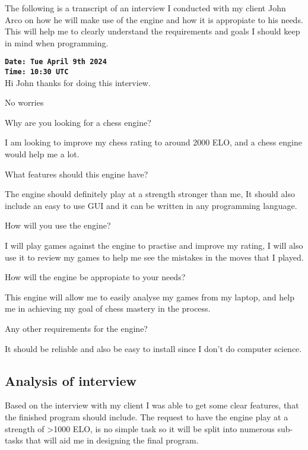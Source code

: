 The following is a transcript of an interview I
conducted with my client John Arco on how he will make use of the
engine and how it is appropiate to his needs. This will 
help me to clearly understand the requirements and goals I
should keep in mind when programming.

\begin{tcolorbox}
\textbf{\texttt {Date: Tue April 9th 2024}}\\
\textbf{\texttt {Time: 10:30 UTC}}\\
 Hi John thanks for doing this interview. \par
{} No worries \par 
{} Why are you looking for a chess engine?\par
{} I am looking to improve my
chess rating to around 2000 ELO, and a chess engine would
help me a lot.\par
{} What features should this
engine have? \par
{} The engine should definitely
play at a strength stronger than me, It should also include
an easy to use GUI and it can be written in any programming
language.\par
{} How will you use the
engine? \par
{} I will play games against the 
engine to practise and improve my rating, I will also use it
to review my games to help me see the mistakes in the moves 
that I played. \par
{} How will the engine be 
appropiate to your needs? \par
{} This engine will allow me to 
easily analyse my games from my laptop, and help me in 
achieving my goal of chess mastery in the process. \par
{} Any other requirements for
the engine? \par
{} It should be reliable and also 
be easy to install since I don't do computer science. \par
\end{tcolorbox}


\subsection*{Analysis of interview}
Based on the interview with my client I was able to get 
some clear features, that the finished program should
include. The request to have the engine play at a strength
of >1000 ELO, is no simple task so it will be split into
numerous sub-tasks that will aid me in designing the final 
program. \\

